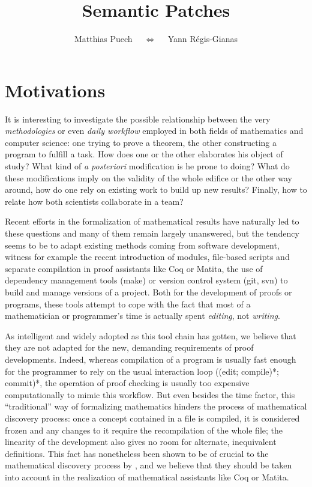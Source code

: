 \documentclass{article}
\title{Semantic Patches
}
\author{Matthias Puech $\quad\Leftrightarrow\quad$ Yann Régis-Gianas}
\date{}
\begin{document}
\maketitle

\section{Motivations}

It is interesting to investigate the possible relationship between the
very \emph{methodologies} or even \emph{daily workflow} employed in
both fields of mathematics and computer science: one trying to prove a
theorem, the other constructing a program to fulfill a task. How does
one or the other elaborates his object of study? What kind of \emph{a
  posteriori} modification is he prone to doing? What do these
modifications imply on the validity of the whole edifice or the other
way around, how do one rely on existing work to build up new results?
Finally, how to relate how both scientists collaborate in a team?

Recent efforts in the formalization of mathematical results have
naturally led to these questions and many of them remain largely
unanswered, but the tendency seems to be to adapt existing methods
coming from software development, witness for example the recent
introduction of modules, file-based scripts and separate compilation
in proof assistants like \textsf{Coq} or \textsf{Matita}, the use of
dependency management tools (\textsf{make}) or version control system
(\textsf{git}, \textsf{svn}) to build and manage versions of a
project. Both for the development of proofs or programs, these tools
attempt to cope with the fact that most of a mathematician or
programmer's time is actually spent \emph{editing}, not
\emph{writing}.

As intelligent and widely adopted as this tool chain has gotten, we
believe that they are not adapted for the new, demanding requirements
of proof developments. Indeed, whereas compilation of a program is
usually fast enough for the programmer to rely on the usual
interaction loop ((edit; compile)*; commit)*, the operation of proof
checking is usually too expensive computationally to mimic this
workflow. But even besides the time factor, this ``traditional'' way
of formalizing mathematics hinders the process of mathematical
discovery process: once a concept contained in a file is compiled, it
is considered frozen and any changes to it require the recompilation
of the whole file; the linearity of the development also gives no room
for alternate, inequivalent definitions. This fact has nonetheless
been shown to be of crucial to the mathematical discovery process by
\cite{lakatos1964proofs}, and we believe that they should be taken
into account in the realization of mathematical assistants like
\textsf{Coq} or \textsf{Matita}.
\end{document}
